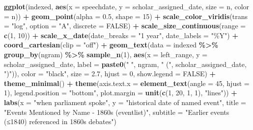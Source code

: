 \documentclass[
]{article}
\newenvironment{Shaded}{\begin{snugshade}}{\end{snugshade}}
\newcommand{\AttributeTok}[1]{\textcolor[rgb]{0.13,0.29,0.53}{#1}}
\newcommand{\ConstantTok}[1]{\textcolor[rgb]{0.56,0.35,0.01}{#1}}
\newcommand{\DecValTok}[1]{\textcolor[rgb]{0.00,0.00,0.81}{#1}}
\newcommand{\FloatTok}[1]{\textcolor[rgb]{0.00,0.00,0.81}{#1}}
\newcommand{\FunctionTok}[1]{\textcolor[rgb]{0.13,0.29,0.53}{\textbf{#1}}}
\newcommand{\NormalTok}[1]{#1}
\newcommand{\SpecialCharTok}[1]{\textcolor[rgb]{0.81,0.36,0.00}{\textbf{#1}}}
\newcommand{\StringTok}[1]{\textcolor[rgb]{0.31,0.60,0.02}{#1}}
\begin{document}
\begin{Shaded}
\begin{Highlighting}[]
\FunctionTok{ggplot}\NormalTok{(indexed, }\FunctionTok{aes}\NormalTok{(}\AttributeTok{x =}\NormalTok{ speechdate, }\AttributeTok{y =}\NormalTok{ scholar\_assigned\_date, }\AttributeTok{size =}\NormalTok{ n, }\AttributeTok{color =}\NormalTok{ n)) }\SpecialCharTok{+}
  \FunctionTok{geom\_point}\NormalTok{(}\AttributeTok{alpha =} \FloatTok{0.5}\NormalTok{, }\AttributeTok{shape =} \DecValTok{15}\NormalTok{) }\SpecialCharTok{+}
  \FunctionTok{scale\_color\_viridis}\NormalTok{(}\AttributeTok{trans =} \StringTok{"log"}\NormalTok{, }\AttributeTok{option =} \StringTok{"A"}\NormalTok{, }\AttributeTok{discrete =} \ConstantTok{FALSE}\NormalTok{) }\SpecialCharTok{+}
  \FunctionTok{scale\_size\_continuous}\NormalTok{(}\AttributeTok{range =} \FunctionTok{c}\NormalTok{(}\DecValTok{1}\NormalTok{, }\DecValTok{10}\NormalTok{)) }\SpecialCharTok{+}
  \FunctionTok{scale\_x\_date}\NormalTok{(}\AttributeTok{date\_breaks =} \StringTok{"1 year"}\NormalTok{, }\AttributeTok{date\_labels =} \StringTok{"\%Y"}\NormalTok{) }\SpecialCharTok{+}
  \FunctionTok{coord\_cartesian}\NormalTok{(}\AttributeTok{clip =} \StringTok{"off"}\NormalTok{) }\SpecialCharTok{+}
  \FunctionTok{geom\_text}\NormalTok{(}\AttributeTok{data =}\NormalTok{ indexed }\SpecialCharTok{\%\textgreater{}\%} \FunctionTok{group\_by}\NormalTok{(ngram) }\SpecialCharTok{\%\textgreater{}\%} \FunctionTok{sample\_n}\NormalTok{(}\DecValTok{1}\NormalTok{),}
            \FunctionTok{aes}\NormalTok{(}\AttributeTok{x =}\NormalTok{ left\_range, }\AttributeTok{y =}\NormalTok{ scholar\_assigned\_date,}
                \AttributeTok{label =} \FunctionTok{paste0}\NormalTok{(}\StringTok{"   "}\NormalTok{, ngram, }\StringTok{" ("}\NormalTok{, scholar\_assigned\_date, }\StringTok{")"}\NormalTok{)),}
            \AttributeTok{color =} \StringTok{"black"}\NormalTok{, }\AttributeTok{size =} \FloatTok{2.7}\NormalTok{, }\AttributeTok{hjust =} \DecValTok{0}\NormalTok{, }\AttributeTok{show.legend =} \ConstantTok{FALSE}\NormalTok{) }\SpecialCharTok{+}
  \FunctionTok{theme\_minimal}\NormalTok{() }\SpecialCharTok{+}
  \FunctionTok{theme}\NormalTok{(}\AttributeTok{axis.text.x =} \FunctionTok{element\_text}\NormalTok{(}\AttributeTok{angle =} \DecValTok{45}\NormalTok{, }\AttributeTok{hjust =} \DecValTok{1}\NormalTok{),}
        \AttributeTok{legend.position =} \StringTok{"bottom"}\NormalTok{,}
        \AttributeTok{plot.margin =} \FunctionTok{unit}\NormalTok{(}\FunctionTok{c}\NormalTok{(}\DecValTok{1}\NormalTok{, }\DecValTok{20}\NormalTok{, }\DecValTok{1}\NormalTok{, }\DecValTok{1}\NormalTok{), }\StringTok{"lines"}\NormalTok{)) }\SpecialCharTok{+}
  \FunctionTok{labs}\NormalTok{(}\AttributeTok{x =} \StringTok{"when parliament spoke"}\NormalTok{,}
       \AttributeTok{y =} \StringTok{"historical date of named event"}\NormalTok{,}
       \AttributeTok{title =} \StringTok{"Events Mentioned by Name {-} 1860s (eventlist)"}\NormalTok{,}
       \AttributeTok{subtitle =} \StringTok{"Earlier events (≤1840) referenced in 1860s debates"}\NormalTok{)}
\end{Highlighting}
\end{Shaded}
\end{document}
